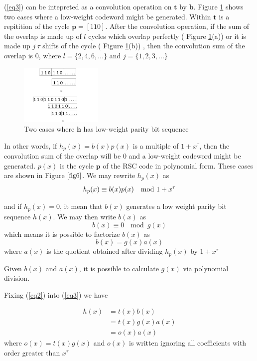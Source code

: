 \documentclass[conference]{IEEEtran}
\begin{document}
 (\ref{eq3}) can be intepreted as a convolution operation on $\textbf{t}$ by $\textbf{b}$. Figure \ref{fig6} shows two cases where a low-weight codeword might be generated. Within $\textbf{t}$ is a repitition of the cycle $\textbf{p}=[1 1 0]$. After the convolution operation, if the sum of the overlap is made up of $l$ cycles which overlap perfectly ( Figure \ref{fig6}(a)) or it is made up $j~\tau$ shifts of the cycle ( Figure \ref{fig6}(b)) , then the convolution sum of the overlap is $0$, where $l=\{2,4,6,...\}$ and $j=\{1,2,3,...\}$
 
 
 \begin{figure}[h]
\centering
		\includegraphics[width=0.35\textwidth]{overlap.png}
		\caption{Two cases where $\textbf{h}$ has low-weight parity bit sequence}
		\label{fig6}
		\end{figure}
		

 In other words, if $ h_p(x)=b(x)p(x)$ is a multiple of $1+ x^{\tau}$, then the convolution sum of the overlap will be $0$ and a low-weight codeword might be generated. $p(x)$ is the cycle $\textbf{p}$ of the  RSC code in polynomial form.
These cases are shown in Figure $\ref{fig6}$.
We may rewrite $ h_p(x)$ as
 \begin{equation}
 h_p(x)  \equiv b(x)p(x) ~\mod{ 1+ x^{\tau}}\\
 \label{eq1}
 \end{equation}

 
and if $h_p(x) = 0$, it mean that $b(x)$ generates a low weight parity bit sequence $h(x)$.  We may then write $b(x)$ as 
 $$b(x) \equiv  0 ~\mod{ g(x)} $$ which means it is possible to factorize $b(x)$ as 
 \begin{equation}
 b(x) =g(x)a(x)
 \label{eq2}
 \end{equation}
 where $a(x)$ is the quotient obtained after dividing $h_p(x)$ by $1+ x^{\tau}$
 
 Given $b(x)$ and $a(x)$, it is possible to calculate $g(x)$ via polynomial division.
 
 Fixing (\ref{eq2}) into (\ref{eq3}) we have 
 
 \begin{equation}
 \begin{split}
 h(x)&=t(x)b(x)\\
 &=t(x)g(x)a(x)\\
 & = o(x)a(x)
 \end{split}
 \label{eq4}
 \end{equation}
 where  $o(x)=t(x)g(x)$ and $o(x)$ is written ignoring all coefficients with order greater than $x^{\tau}$
 
\end{document}

